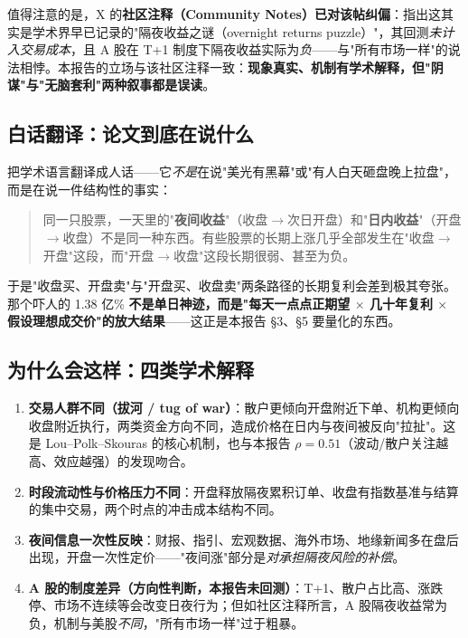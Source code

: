 \documentclass[11pt,a4paper,fontset=none]{ctexart}
\begin{document}
值得注意的是，X 的\textbf{社区注释（Community Notes）已对该帖纠偏}：指出这其实是学术界早已记录的"隔夜收益之谜（overnight returns puzzle）"，其回测\emph{未计入交易成本}，且 A 股在 T+1 制度下隔夜收益实际为\emph{负}——与"所有市场一样"的说法相悖。本报告的立场与该社区注释一致：\textbf{现象真实、机制有学术解释，但"阴谋"与"无脑套利"两种叙事都是误读}。

\subsection{白话翻译：论文到底在说什么}
把学术语言翻译成人话——它\emph{不是}在说"美光有黑幕"或"有人白天砸盘晚上拉盘"，而是在说一件结构性的事实：

\begin{quote}
同一只股票，一天里的"\textbf{夜间收益}"（收盘$\to$次日开盘）和"\textbf{日内收益}"（开盘$\to$收盘）不是同一种东西。有些股票的长期上涨几乎全部发生在"收盘$\to$开盘"这段，而"开盘$\to$收盘"这段长期很弱、甚至为负。
\end{quote}

于是"收盘买、开盘卖"与"开盘买、收盘卖"两条路径的长期复利会差到极其夸张。那个吓人的 1.38 亿\% \textbf{不是单日神迹，而是"每天一点点正期望 $\times$ 几十年复利 $\times$ 假设理想成交价"的放大结果}——这正是本报告 §3、§5 要量化的东西。

\subsection{为什么会这样：四类学术解释}
\begin{enumerate}\itemsep2pt
  \item \textbf{交易人群不同（拔河 / tug of war）}：散户更倾向开盘附近下单、机构更倾向收盘附近执行，两类资金方向不同，造成价格在日内与夜间被反向"拉扯"。这是 Lou--Polk--Skouras 的核心机制，也与本报告 $\rho=0.51$（波动/散户关注越高、效应越强）的发现吻合。
  \item \textbf{时段流动性与价格压力不同}：开盘释放隔夜累积订单、收盘有指数基准与结算的集中交易，两个时点的冲击成本结构不同。
  \item \textbf{夜间信息一次性反映}：财报、指引、宏观数据、海外市场、地缘新闻多在盘后出现，开盘一次性定价——"夜间涨"部分是\emph{对承担隔夜风险的补偿}。
  \item \textbf{A 股的制度差异（方向性判断，本报告未回测）}：T+1、散户占比高、涨跌停、市场不连续等会改变日夜行为；但如社区注释所言，A 股隔夜收益常为负，机制与美股\emph{不同}，"所有市场一样"过于粗暴。
\end{enumerate}
\end{document}
